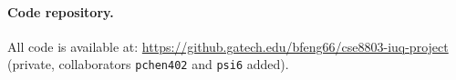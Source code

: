 \documentclass[11pt]{article}
\begin{document}
\paragraph{Code repository.}
All code is available at: \url{https://github.gatech.edu/bfeng66/cse8803-iuq-project} (private, collaborators \texttt{pchen402} and \texttt{psi6} added).

\vspace{1em}


\end{document}
